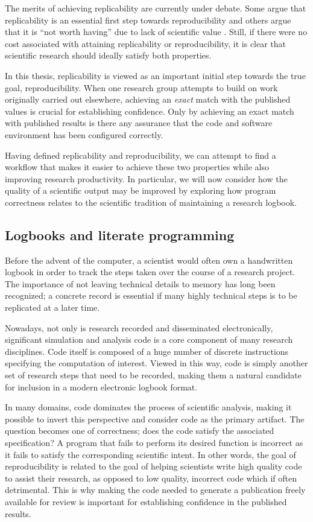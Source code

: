 \documentclass[phd,ianc,twoside]{infthesis}
\begin{document}
The merits of achieving replicability are currently under debate. Some
argue that replicability is an essential first step towards
reproducibility \cite{gent_corr13} and others argue that it is ``not
worth having'' due to lack of scientific value
\citep{drummond_icml09}. Still, if there were no cost associated with attaining
replicability or reproducibility, it is clear that scientific
research should ideally satisfy both properties.

In this thesis, replicability is viewed as an important initial step
towards the true goal, reproducibility. When one research group attempts
to build on work originally carried out elsewhere, achieving an
\emph{exact} match with the published values is crucial for establishing
confidence. Only by achieving an exact match with published results is
there any assurance that the code and software environment has been
configured correctly.

Having defined replicability and reproducibility, we can attempt to find
a workflow that makes it easier to achieve these two properties while
also improving research productivity. In particular, we will now
consider how the quality of a scientific output may be improved by
exploring how program correctness relates to the scientific tradition of
maintaining a research logbook.

\subsection{Logbooks and literate programming}

Before the advent of the computer, a scientist would often own a
handwritten logbook in order to track the steps taken over the course of
a research project. The importance of not leaving technical details to
memory has long been recognized; a concrete record is essential if many
highly technical steps is to be replicated at a later time.

Nowadays, not only is research recorded and disseminated electronically,
significant simulation and analysis code is a core component of many
research disciplines. Code itself is composed of a huge number of
discrete instructions specifying the computation of interest. Viewed in
this way, code is simply another set of research steps that need to be
recorded, making them a natural candidate for inclusion in a modern
electronic logbook format.

In many domains, code dominates the process of scientific analysis,
making it possible to invert this perspective and consider code as the
primary artifact. The question becomes one of correctness; does the code
satisfy the associated specification? A program that fails to perform
its desired function is incorrect as it fails to satisfy the
corresponding scientific intent.  In other words, the goal of
reproducibility is related to the goal of helping scientists write high
quality code to assist their research, as opposed to low quality,
incorrect code which if often detrimental. This is why making the code
needed to generate a publication freely available for review is
important for establishing confidence in the published results.
\end{document}
